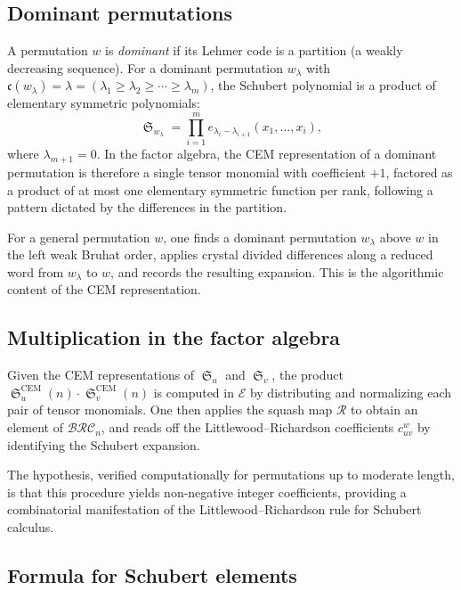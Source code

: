 \documentclass{amsart}
\theoremstyle{definition}
\theoremstyle{remark}
\numberwithin{equation}{section}
\DeclareMathOperator{\sch}{\mathfrak{S}}
\newcommand{\BRC}{\mathcal{BRC}}
\newcommand{\code}{\mathfrak{c}}
\begin{document}
\subsection{Dominant permutations}

A permutation $w$ is \textit{dominant} if its Lehmer code is a partition (a weakly decreasing sequence).  For a dominant permutation $w_\lambda$ with $\code(w_\lambda) = \lambda = (\lambda_1 \geq \lambda_2 \geq \cdots \geq \lambda_m)$, the Schubert polynomial is a product of elementary symmetric polynomials:
\[
\sch_{w_\lambda} = \prod_{i = 1}^{m} e_{\lambda_i - \lambda_{i+1}}(x_1, \ldots, x_i),
\]
where $\lambda_{m+1} = 0$.  In the factor algebra, the CEM representation of a dominant permutation is therefore a single tensor monomial with coefficient $+1$, factored as a product of at most one elementary symmetric function per rank, following a pattern dictated by the differences in the partition.

For a general permutation $w$, one finds a dominant permutation $w_\lambda$ above $w$ in the left weak Bruhat order, applies crystal divided differences along a reduced word from $w_\lambda$ to $w$, and records the resulting expansion.  This is the algorithmic content of the CEM representation.

\subsection{Multiplication in the factor algebra}

Given the CEM representations of $\sch_u$ and $\sch_v$, the product $\sch_u^{\mathrm{CEM}}(n) \cdot \sch_v^{\mathrm{CEM}}(n)$ is computed in $\mathcal{E}$ by distributing and normalizing each pair of tensor monomials.  One then applies the squash map $\mathcal{R}$ to obtain an element of $\BRC_n$, and reads off the Littlewood--Richardson coefficients $c_{uv}^w$ by identifying the Schubert expansion.

The hypothesis, verified computationally for permutations up to moderate length, is that this procedure yields non-negative integer coefficients, providing a combinatorial manifestation of the Littlewood--Richardson rule for Schubert calculus.

\subsection{Formula for Schubert elements}
\end{document}
